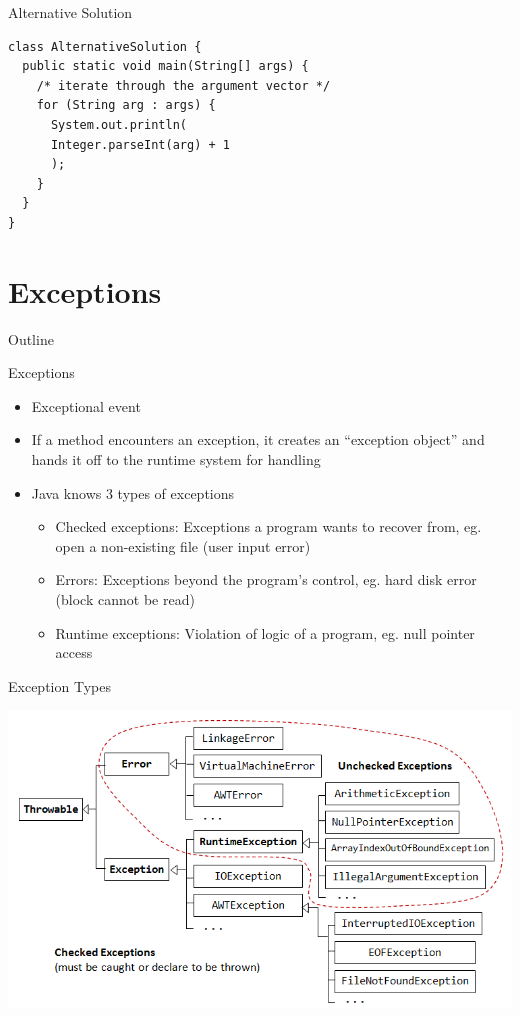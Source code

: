 \begin{frame}[fragile]{Alternative Solution}
  \begin{lstlisting}
class AlternativeSolution {
  public static void main(String[] args) {
    /* iterate through the argument vector */
    for (String arg : args) {		
      System.out.println(
      Integer.parseInt(arg) + 1
      );
    }
  } 		
}
  \end{lstlisting}
\end{frame}


\section{Exceptions}

\begin{frame}{Outline}
  \tableofcontents[current]
\end{frame}

\begin{frame}{Exceptions}
  \begin{itemize}
  \item Exceptional event
  \item If a method encounters an exception, it creates an ``exception
    object'' and hands it off to the runtime system for handling
  \item Java knows 3 types of exceptions
    \begin{itemize}
    \item Checked exceptions: Exceptions a program wants to recover
      from, eg. open a non-existing file (user input error)
    \item Errors: Exceptions beyond the program's control, eg. hard
      disk error (block cannot be read)
    \item Runtime exceptions: Violation of logic of a program,
      eg. null pointer access
    \end{itemize}
  \end{itemize}
\end{frame}

\begin{frame}{Exception Types}
  \begin{center}
    \includegraphics[width=\textwidth]{figures/exception-classes}
  \end{center}  
\end{frame}

